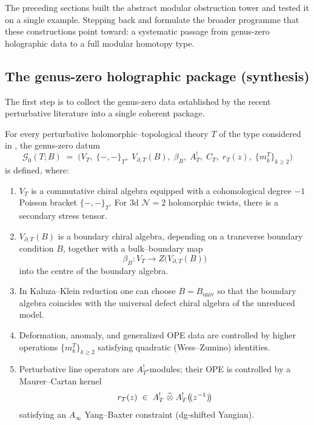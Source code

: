 The preceding sections built the abstract modular obstruction tower and tested it on a single
example. Stepping back and formulate the broader programme that these constructions
point toward: a systematic passage from genus-zero holographic data to a full modular
homotopy type.

\subsection{The genus-zero holographic package (synthesis)}

The first step is to collect the genus-zero data established by the recent perturbative
literature into a single coherent package.

\begin{theorem}
For every perturbative holomorphic--topological theory $T$ of the type considered in
\cite{CDG20, Zeng23, GKW24, KZ25, DNP25}, the genus-zero datum
\[
\mathcal G_0(T;B)
\;=\;
\bigl(V_T,\;\{-,-\}_T,\;V_{\partial,T}(B),\;\beta_B,\;A_T^!,\;C_T,\;r_T(z),\;\{m_k^T\}_{k\ge 2}\bigr)
\]
is defined, where:
\begin{enumerate}[label=\textup{(\arabic*)}]
\item $V_T$ is a commutative chiral algebra equipped with a cohomological degree $-1$ Poisson
bracket $\{-,-\}_T$. For $3$d $\mathcal N=2$ holomorphic twists, there is a secondary stress
tensor.

\item $V_{\partial,T}(B)$ is a boundary chiral algebra, depending on a transverse boundary
condition $B$, together with a bulk--boundary map
\[
\beta_B:V_T\longrightarrow Z\bigl(V_{\partial,T}(B)\bigr)
\]
into the centre of the boundary algebra.

\item In Kaluza--Klein reduction one can choose $B=B_{\mathrm{univ}}$ so that the boundary algebra
coincides with the universal defect chiral algebra of the unreduced model.

\item Deformation, anomaly, and generalized OPE data are controlled by higher operations
$\{m_k^T\}_{k\ge 2}$ satisfying quadratic (Wess--Zumino) identities.

\item Perturbative line operators are $A_T^!$-modules; their OPE is controlled by a
Maurer--Cartan kernel
\[
r_T(z)\;\in\;A_T^!\;\widehat\otimes\;A_T^!\bigl(\!(z^{-1})\!\bigr)
\]
satisfying an $A_\infty$ Yang--Baxter constraint (dg-shifted Yangian).
\end{enumerate}
\end{theorem}

